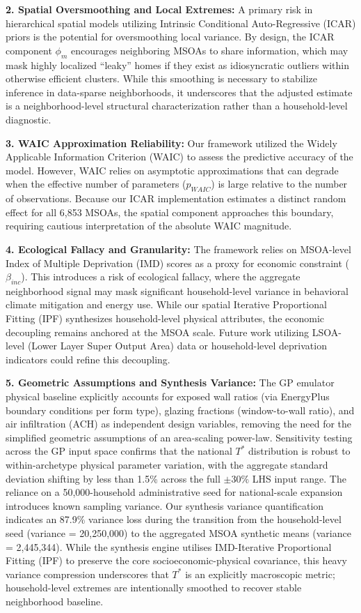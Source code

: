 \documentclass[11pt, a4paper, twocolumn, numbers]{elsarticle}
\begin{document}
\textbf{2. Spatial Oversmoothing and Local Extremes:} A primary risk in
hierarchical spatial models utilizing Intrinsic Conditional
Auto-Regressive (ICAR) priors is the potential for oversmoothing local
variance. By design, the ICAR component \(\phi_m\) encourages
neighboring MSOAs to share information, which may mask highly localized
``leaky'' homes if they exist as idiosyncratic outliers within otherwise
efficient clusters. While this smoothing is necessary to stabilize
inference in data-sparse neighborhoods, it underscores that the adjusted estimate is a 
neighborhood-level structural characterization rather than a 
household-level diagnostic.

\textbf{3. WAIC Approximation Reliability:} Our framework utilized the Widely Applicable Information Criterion (WAIC) to assess the predictive accuracy of the model. However, WAIC relies on asymptotic approximations that can degrade when the effective number of parameters ($p_{WAIC}$) is large relative to the number of observations. Because our ICAR implementation estimates a distinct random effect for all 6,853 MSOAs, the spatial component approaches this boundary, requiring cautious interpretation of the absolute WAIC magnitude.

\textbf{4. Ecological Fallacy and Granularity:} The framework relies on
MSOA-level Index of Multiple Deprivation (IMD) scores as a proxy for
economic constraint (\(\beta_{inc}\)). This introduces a risk of
ecological fallacy, where the aggregate neighborhood signal may mask
significant household-level variance in behavioral climate mitigation
and energy use. While our spatial Iterative Proportional Fitting (IPF) synthesizes
household-level physical attributes, the economic decoupling remains
anchored at the MSOA scale. Future work utilizing LSOA-level (Lower
Layer Super Output Area) data or household-level deprivation indicators
could refine this decoupling.

\textbf{5. Geometric Assumptions and Synthesis Variance:} The GP
emulator physical baseline explicitly accounts for exposed wall ratios
(via EnergyPlus boundary conditions per form type), glazing fractions
(window-to-wall ratio), and air infiltration (ACH) as independent
design variables, removing the need for the simplified geometric
assumptions of an area-scaling power-law. Sensitivity testing across the
GP input space confirms that the national \(T^*\) distribution is robust
to within-archetype physical parameter variation, with the aggregate
standard deviation shifting by less than 1.5\% across the
full \(\pm 30\%\) LHS input range. The reliance on
a 50,000-household administrative seed for national-scale expansion
introduces known sampling variance. Our synthesis variance quantification indicates an 87.9\% variance loss during the transition from the household-level seed (variance = 20,250,000) to the aggregated MSOA synthetic means (variance = 2,445,344). While the synthesis engine utilises IMD-Iterative Proportional Fitting (IPF) to preserve the core socioeconomic-physical covariance, this heavy variance compression underscores that $T^*$ is an explicitly macroscopic metric; household-level extremes are intentionally smoothed to recover stable neighborhood baseline.
\end{document}

